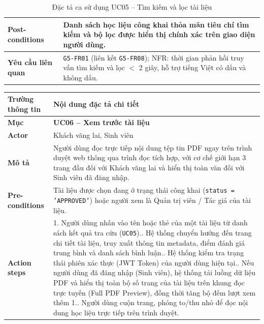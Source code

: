 \begin{table}[H]
\begin{tabularx}{\textwidth}{|p{3.5cm}|X|}
\hline
\textbf{Post-conditions} & Danh sách học liệu công khai thỏa mãn tiêu chí tìm kiếm và bộ lọc được hiển thị chính xác trên giao diện người dùng. \\
\hline
\textbf{Yêu cầu liên quan} & \texttt{G5-FR01} (liên kết \texttt{G5-FR08}); NFR: thời gian phản hồi truy vấn tìm kiếm và lọc $<$ 2 giây, hỗ trợ tiếng Việt có dấu và không dấu. \\
\hline
\end{tabularx}
\caption{Đặc tả ca sử dụng UC05 -- Tìm kiếm và lọc tài liệu}
\label{tab:uc05}
\end{table}


\begin{table}[H]
\centering
\footnotesize\linespread{1.05}\selectfont
\setlength{\tabcolsep}{5pt}
\renewcommand{\arraystretch}{1.12}
\begin{tabularx}{\textwidth}{|p{3.5cm}|X|}
\hline
\rowcolor[HTML]{EAEAEA}
\textbf{Trường thông tin} & \textbf{Nội dung đặc tả chi tiết} \\
\hline
\textbf{Mục} & \textbf{UC06 -- Xem trước tài liệu} \\
\hline
\textbf{Actor} & Khách vãng lai, Sinh viên \\
\hline
\textbf{Mô tả} & Người dùng đọc trực tiếp nội dung tệp tin PDF ngay trên trình duyệt web thông qua trình đọc tích hợp, với cơ chế giới hạn 3 trang đầu đối với Khách vãng lai và hiển thị toàn văn đối với Sinh viên đã đăng nhập. \\
\hline
\textbf{Pre-conditions} & Tài liệu được chọn đang ở trạng thái công khai (\texttt{status = 'APPROVED'}) hoặc người xem là Quản trị viên / Tác giả của tài liệu. \\
\hline
\textbf{Action steps} & 1. Người dùng nhấn vào tên hoặc thẻ của một tài liệu từ danh sách kết quả tra cứu (\texttt{UC05}).\newline 2. Hệ thống chuyển hướng đến trang chi tiết tài liệu, truy xuất thông tin metadata, điểm đánh giá trung bình và danh sách bình luận.\newline 3. Hệ thống kiểm tra trạng thái phiên xác thực (JWT Token) của người dùng hiện tại.\newline 4. Nếu người dùng đã đăng nhập (Sinh viên), hệ thống tải luồng dữ liệu PDF và hiển thị toàn bộ số trang của tài liệu trên khung đọc trực tuyến (Full PDF Preview), đồng thời tăng bộ đếm lượt xem thêm 1.\newline 5. Người dùng cuộn trang, phóng to/thu nhỏ để đọc nội dung học liệu trực tiếp trên trình duyệt. \\

\end{tabularx}
\end{table}
